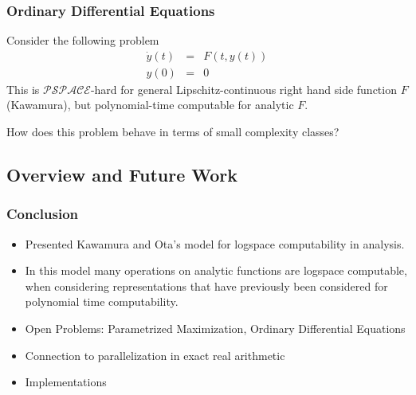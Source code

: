 \documentclass[xcolor=pdftex,dvipsnames,table]{beamer}
\newcommand{\pspace}{\ensuremath{\mathcal{ PSPACE }}\xspace}
\begin{document}
\begin{frame}
  \frametitle{Ordinary Differential Equations}
  Consider the following problem
\begin{eqnarray*}
  \dot y(t) &=& F(t, y(t)) \\
  y(0) &=& 0 
\end{eqnarray*}
This is \pspace-hard for general Lipschitz-continuous right hand side function $F$ (Kawamura),
but polynomial-time computable for analytic $F$.

How does this problem behave in terms of small complexity classes?
 \end{frame}
\subsection*{Overview and Future Work}
\begin{frame}
  \frametitle{Conclusion}
  \begin{itemize}
    \item Presented Kawamura and Ota's model for logspace computability in analysis.
    \item In this model many operations on analytic functions are logspace computable, when considering representations that have previously been considered for polynomial time computability.
    \item Open Problems: Parametrized Maximization, Ordinary Differential Equations
     \item Connection to parallelization in exact real arithmetic
     \item Implementations
  \end{itemize}
\end{frame}
\end{document}
